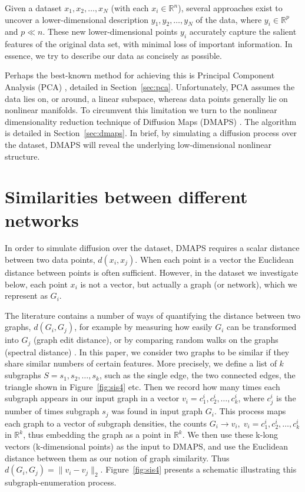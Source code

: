 Given a dataset ${x_1, x_2, \dots, x_N}$ (with each
$x_i \in \mathbb{R}^n$), several approaches exist to uncover a
lower-dimensional description ${y_1, y_2, \dots, y_N}$ of the data,
where $y_i \in \mathbb{R}^p$ and $p \ll n$. These new
lower-dimensional points $y_i$ accurately capture the salient features
of the original data set, with minimal loss of important
information. In essence, we try to describe our data as concisely as
possible.

Perhaps the best-known method for achieving this is Principal
Component Analysis (PCA) \cite{jolliffe_principal_2014}, detailed in
Section~\ref{sec:pca}. Unfortunately, PCA assumes the data lies on,
or around, a linear subspace, whereas data points generally lie on
nonlinear manifolds. To circumvent this limitation we turn to the
nonlinear dimensionality reduction technique of Diffusion Maps (DMAPS)
\cite{coifman_diffusion_2006}. The algorithm is detailed in
Section~\ref{sec:dmaps}. In brief, by simulating a diffusion process
over the dataset, DMAPS will reveal the underlying low-dimensional
nonlinear structure.

\section{Similarities between different networks}

In order to simulate diffusion over the dataset, DMAPS requires a
scalar distance between two data points, $d(x_i, x_j)$. When each
point is a vector the Euclidean distance between points is often
sufficient. However, in the dataset we investigate below, each point
$x_i$ is not a vector, but actually a graph (or network), which we
represent as $G_i$.

The literature contains a number of ways of quantifying the distance
between two graphs, $d(G_i, G_j)$, for example by measuring how easily
$G_i$ can be transformed into $G_j$ (graph edit distance), or by
comparing random walks on the graphs (spectral distance)
\cite{bunke_graph_1998,gao_survey_2010,papadimitriou_web_2010,vishwanathan_graph_2010}. In
this paper, we consider two graphs to be similar if they share similar
numbers of certain features. More precisely, we define a list of $k$
subgraphs $S = {s_1, s_2, \dots, s_k}$, such as the single edge, the
two connected edges, the triangle shown in Figure~\ref{fig:sis4} etc. Then we
record how many times each subgraph appears in our input graph in a
vector $v_i = {c_1^i, c_2^i, \dots, c_k^i}$, where $c_j^i$ is the
number of times subgraph $s_j$ was found in input graph $G_i$. This
process maps each graph to a vector of subgraph densities, the counts
$G_i \rightarrow v_i, \; v_i = {c_1^i, c_2^i, \dots, c_k^i}$ in
$\mathbb{R}^k$, thus embedding the graph as a point in
$\mathbb{R}^k$. We then use these k-long vectors (k-dimensional
points) as the input to DMAPS, and use the Euclidean distance between
them as our notion of graph similarity. Thus
$d(G_i, G_j) = \| v_i - v_j \|_2$. Figure~\ref{fig:sis4} presents a schematic
illustrating this subgraph-enumeration process.


